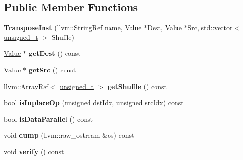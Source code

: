 \subsection*{Public Member Functions}
\begin{DoxyCompactItemize}
\item 
\mbox{\label{classglow_1_1_transpose_inst_a3cc4b558c94c2152cedd55d2ca391f24}} 
{\bfseries Transpose\+Inst} (llvm\+::\+String\+Ref name, \hyperlink{classglow_1_1_value}{Value} $\ast$Dest, \hyperlink{classglow_1_1_value}{Value} $\ast$Src, std\+::vector$<$ \hyperlink{namespaceglow_a0ca574644e1e42ef193a9947fb4d8911}{unsigned\+\_\+t} $>$ Shuffle)
\item 
\mbox{\label{classglow_1_1_transpose_inst_a5313a9571a8f88b5e3a08566a13ec72c}} 
\hyperlink{classglow_1_1_value}{Value} $\ast$ {\bfseries get\+Dest} () const
\item 
\mbox{\label{classglow_1_1_transpose_inst_ad1926e6e9f7b0baab60c78de0b5d64cf}} 
\hyperlink{classglow_1_1_value}{Value} $\ast$ {\bfseries get\+Src} () const
\item 
\mbox{\label{classglow_1_1_transpose_inst_ac8f172654fe6bbbaa7084bc966b1b2fc}} 
llvm\+::\+Array\+Ref$<$ \hyperlink{namespaceglow_a0ca574644e1e42ef193a9947fb4d8911}{unsigned\+\_\+t} $>$ {\bfseries get\+Shuffle} () const
\item 
\mbox{\label{classglow_1_1_transpose_inst_a1fb18704884cc4c5832e4f3c667ad4f3}} 
bool {\bfseries is\+Inplace\+Op} (unsigned dst\+Idx, unsigned src\+Idx) const
\item 
\mbox{\label{classglow_1_1_transpose_inst_a6d36fb48d0be088d8df2ec25f77f0296}} 
bool {\bfseries is\+Data\+Parallel} () const
\item 
\mbox{\label{classglow_1_1_transpose_inst_aca285fffe51f98f191e3c9e917cfb002}} 
void {\bfseries dump} (llvm\+::raw\+\_\+ostream \&os) const
\item 
\mbox{\label{classglow_1_1_transpose_inst_aaeecca33c33bd8002fc6dab03d9c0ec3}} 
void {\bfseries verify} () const
\end{DoxyCompactItemize}
